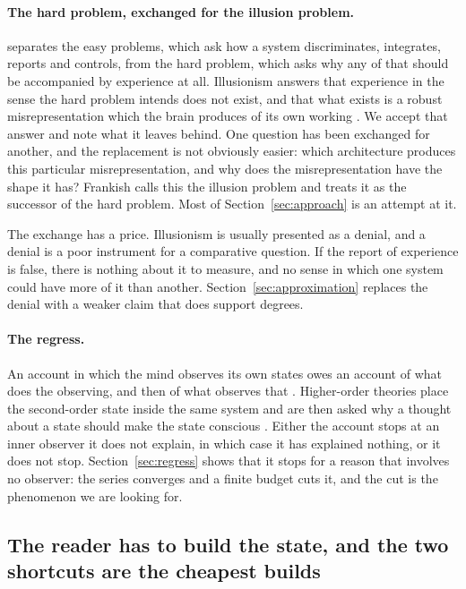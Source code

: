 \paragraph{The hard problem, exchanged for the illusion problem.}
\citet{chalmers1995} separates the easy problems, which ask how a system discriminates, integrates,
reports and controls, from the hard problem, which asks why any of that should be accompanied by
experience at all. Illusionism answers that experience in the sense the hard problem intends does not
exist, and that what exists is a robust misrepresentation which the brain produces of its own working
\citep{dennett1991,frankish2016}. We accept that answer and note what it leaves behind. One question
has been exchanged for another, and the replacement is not obviously easier: which architecture
produces this particular misrepresentation, and why does the misrepresentation have the shape it has?
Frankish calls this the illusion problem and treats it as the successor of the hard problem. Most of
Section~\ref{sec:approach} is an attempt at it.

The exchange has a price. Illusionism is usually presented as a denial, and a denial is a poor
instrument for a comparative question. If the report of experience is false, there is nothing about it
to measure, and no sense in which one system could have more of it than another.
Section~\ref{sec:approximation} replaces the denial with a weaker claim that does support degrees.

\paragraph{The regress.}
An account in which the mind observes its own states owes an account of what does the observing, and
then of what observes that \citep{dennett1991,ryle1949}. Higher-order theories place the second-order
state inside the same system and are then asked why a thought about a state should make the state
conscious \citep{rosenthal2005}. Either the account stops at an inner observer it does not explain, in
which case it has explained nothing, or it does not stop. Section~\ref{sec:regress} shows that it
stops for a reason that involves no observer: the series converges and a finite budget cuts it, and
the cut is the phenomenon we are looking for.

\subsection{The reader has to build the state, and the two shortcuts are the cheapest builds}
\label{sec:reader}

